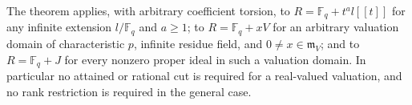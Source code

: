 
\begin{corollary}\label{cor:valuation-conductor-specializations}
The theorem applies, with arbitrary coefficient torsion, to
$R=\mathbb F_q+t^al[[t]]$ for any infinite extension
$l/\mathbb F_q$ and $a\ge1$; to $R=\mathbb F_q+xV$ for an arbitrary
valuation domain of characteristic $p$, infinite residue field, and
$0\ne x\in\mathfrak m_V$; and to $R=\mathbb F_q+J$ for every
nonzero proper ideal in such a valuation domain. In particular no
attained or rational cut is required for a real-valued valuation,
and no rank restriction is required in the general case.
\end{corollary}

